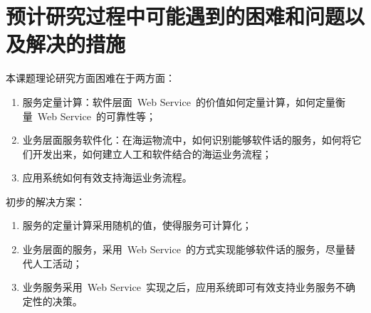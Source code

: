 \section{预计研究过程中可能遇到的困难和问题以及解决的措施}

本课题理论研究方面困难在于两方面：
\begin{enumerate}
    \item 服务定量计算：软件层面~Web Service~的价值如何定量计算，如何定量衡量~Web Service~的可靠性等；
    \item 业务层面服务软件化：在海运物流中，如何识别能够软件话的服务，如何将它们开发出来，如何建立人工和软件结合的海运业务流程；
    \item 应用系统如何有效支持海运业务流程。
\end{enumerate}

初步的解决方案：
\begin{enumerate}
    \item 服务的定量计算采用随机的值，使得服务可计算化；
    \item 业务层面的服务，采用~Web Service~的方式实现能够软件话的服务，尽量替代人工活动；
    \item 业务服务采用~Web Service~实现之后，应用系统即可有效支持业务服务不确定性的决策。
\end{enumerate}